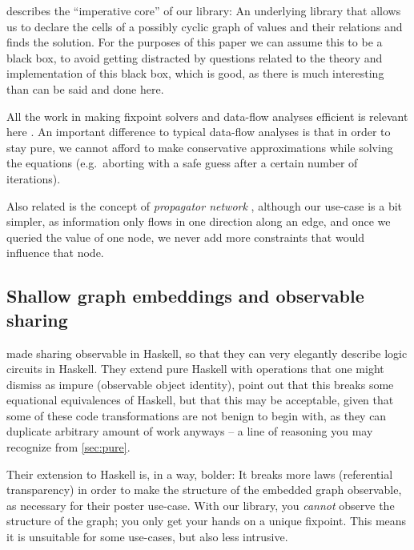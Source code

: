 \documentclass[manuscript,anonymous,screen,acmsmall]{acmart}
\begin{document}
 describes the “imperative core” of our library: An underlying library that allows us to declare the cells of a possibly cyclic graph of values and their relations and finds the solution. For the purposes of this paper we can assume this to be a black box, to avoid getting distracted by questions related to the theory and implementation of this black box, which is good, as there is much interesting than can be said and done here.

All the work in making fixpoint solvers and data-flow analyses efficient is relevant here \citep{kildall-73,kam-ullman-76}. An important difference to typical data-flow analyses is that in order to stay pure, we cannot afford to make conservative approximations while solving the equations (e.g.\ aborting with a safe guess after a certain number of iterations).

Also related is the concept of \emph{propagator network} \citep{propagator}, although our use-case is a bit simpler, as information only flows in one direction along an edge, and once we queried the value of one node, we never add more constraints that would influence that node.

%

\subsection{Shallow graph embeddings and observable sharing}

 made sharing observable in Haskell, so that they can very elegantly describe logic circuits in Haskell. They extend pure Haskell with operations that one might dismiss as impure (observable object identity), point out that this breaks some equational equivalences of Haskell, but that this may be acceptable, given that some of these code transformations are not benign to begin with, as they can duplicate arbitrary amount of work anyways -- a line of reasoning you may recognize from \cref{sec:pure}.

Their extension to Haskell is, in a way, bolder: It breaks more laws (referential transparency) in order to make the structure of the embedded graph observable, as necessary for their poster use-case. With our library, you \emph{cannot} observe the structure of the graph; you only get your hands on a unique fixpoint. This means it is unsuitable for some use-cases, but also less intrusive.
\end{document}
